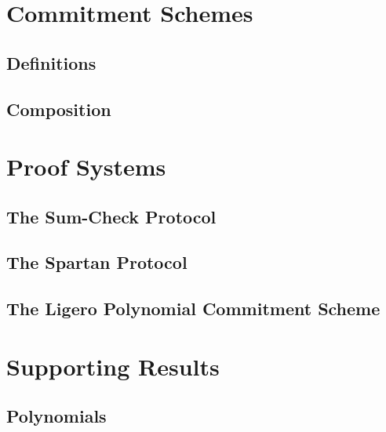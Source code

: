 \begin{definition}
    \label{def:oracle_verifier_composition}
\end{definition}

\begin{definition}
    \label{def:interactive_protocol_composition}
\end{definition}

\chapter{Commitment Schemes}

\section{Definitions}

\section{Composition}



\chapter{Proof Systems}

\section{The Sum-Check Protocol}

\section{The Spartan Protocol}

\section{The Ligero Polynomial Commitment Scheme}


\chapter{Supporting Results}

\section{Polynomials}


